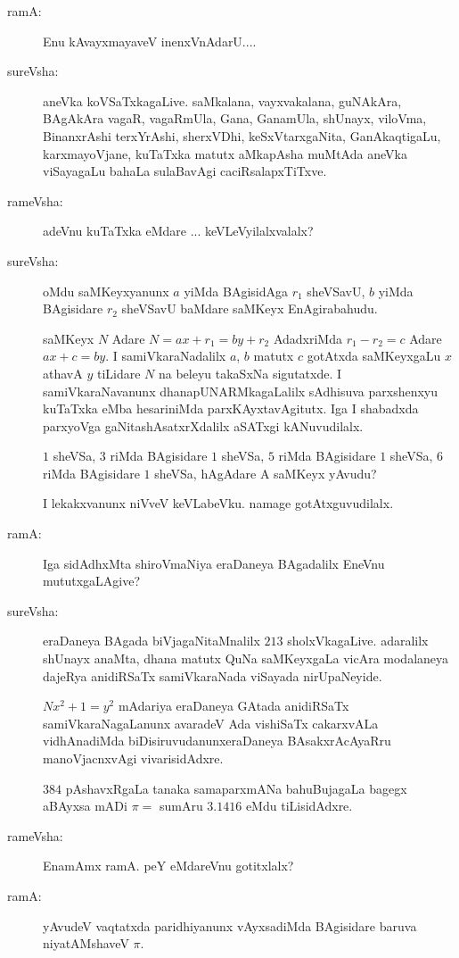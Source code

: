 \begin{description}
\item[ramA:] Enu kAvayxmayaveV inenxVnAdarU....

\item[sureVsha:] aneVka koVSaTxkagaLive. saMkalana, vayxvakalana, guNAkAra, BAgAkAra vagaR, vagaRmUla, Gana, GanamUla, shUnayx, viloVma, BinanxrAshi terxYrAshi, sherxVDhi, keSxVtarxgaNita, GanAkaqtigaLu, karxmayoVjane, kuTaTxka matutx aMkapAsha muMtAda aneVka viSayagaLu bahaLa sulaBavAgi caciRsalapxTiTxve.

\item[rameVsha:] adeVnu kuTaTxka eMdare ... keVLeVyilalxvalalx?

\item[sureVsha:] oMdu saMKeyxyanunx $a$ yiMda BAgisidAga $r_{1}$ sheVSavU, $b$ yiMda BAgisidare $r_{2}$ sheVSavU baMdare saMKeyx EnAgirabahudu.

saMKeyx $N$ Adare $N=ax+r_{1}=by+r_{2}$ AdadxriMda $r_{1}-r_{2}=c$ Adare $ax+c=by$. I samiVkaraNadalilx $a$, $b$ matutx $c$ gotAtxda saMKeyxgaLu $x$ athavA $y$ tiLidare $N$ na beleyu takaSxNa sigutatxde. I samiVkaraNavanunx dhanapUNARMkagaLalilx sAdhisuva parxshenxyu kuTaTxka eMba hesariniMda parxKAyxtavAgitutx. Iga I shabadxda parxyoVga gaNitashAsatxrXdalilx aSATxgi kANuvudilalx.

$1$ sheVSa, $3$ riMda BAgisidare $1$ sheVSa, $5$ riMda BAgisidare $1$ sheVSa, $6$ riMda BAgisidare $1$ sheVSa, hAgAdare A saMKeyx yAvudu?

I lekakxvanunx niVveV keVLabeVku. namage gotAtxguvudilalx.

\item[ramA:] Iga sidAdhxMta shiroVmaNiya eraDaneya BAgadalilx EneVnu mututxgaLAgive?

\item[sureVsha:] eraDaneya BAgada biVjagaNitaMnalilx $213$ sholxVkagaLive. adaralilx shUnayx anaMta, dhana matutx QuNa saMKeyxgaLa vicAra modalaneya dajeRya anidiRSaTx samiVkaraNada viSayada nirUpaNeyide.

$Nx^{2}+1=y^{2}$ mAdariya eraDaneya GAtada anidiRSaTx samiVkaraNagaLanunx avaradeV Ada vishiSaTx cakarxvALa vidhAnadiMda biDisiruvudanunx\break eraDaneya BAsakxrAcAyaRru manoVjacnxvAgi vivarisidAdxre.

$384$ pAshavxRgaLa tanaka samaparxmANa bahuBujagaLa bagegx aBAyxsa mADi $\pi=$ sumAru $3.1416$ eMdu tiLisidAdxre.

\item[rameVsha:] EnamAmx ramA. peY eMdareVnu gotitxlalx?

\item[ramA:] yAvudeV vaqtatxda paridhiyanunx vAyxsadiMda BAgisidare baruva niyatAMshaveV $\pi$.


\end{description}
